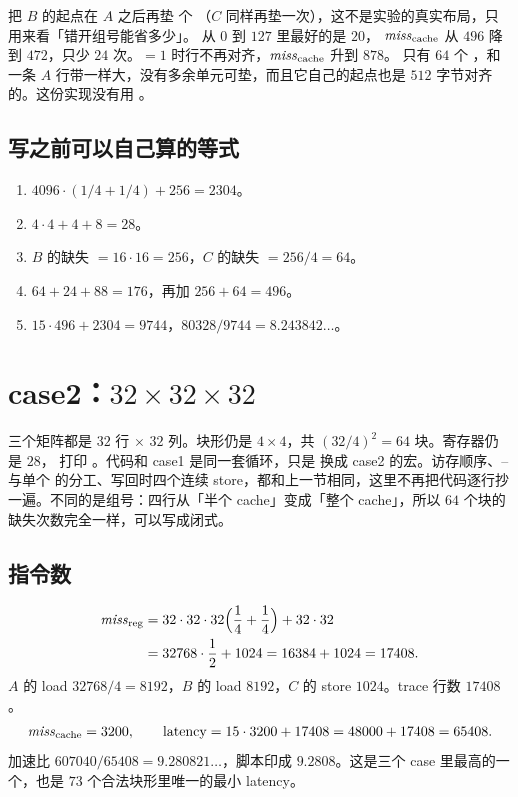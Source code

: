 把 $B$ 的起点在 $A$ 之后再垫  个 （$C$ 同样再垫一次），这不是实验的真实布局，只用来看「错开组号能省多少」。 从 $0$ 到 $127$ 里最好的是 $20$， $\mathit{miss}_{\mathrm{cache}}$ 从 $496$ 降到 $472$，只少 $24$ 次。$=1$ 时行不再对齐，$\mathit{miss}_{\mathrm{cache}}$ 升到 $878$。 只有 $64$ 个 ，和一条 $A$ 行带一样大，没有多余单元可垫，而且它自己的起点也是 $512$ 字节对齐的。这份实现没有用 。

\subsection{写之前可以自己算的等式}

\begin{enumerate}
  \item $4096\cdot(1/4+1/4)+256=2304$。
  \item $4\cdot4+4+8=28$。
  \item $B$ 的缺失 $=16\cdot16=256$，$C$ 的缺失 $=256/4=64$。
  \item $64+24+88=176$，再加 $256+64=496$。
  \item $15\cdot496+2304=9744$，$80328/9744=8.243842\ldots$。
\end{enumerate}

\section{case2：\texorpdfstring{$32\times 32\times 32$}{32x32x32}}
\label{sec:c2}

三个矩阵都是 $32$ 行 $\times$ $32$ 列。块形仍是 $4\times4$，共 $(32/4)^2=64$ 块。寄存器仍是 $28$， 打印 。代码和 case1 是同一套循环，只是  换成 case2 的宏。访存顺序、-- 与单个  的分工、写回时四个连续 store，都和上一节相同，这里不再把代码逐行抄一遍。不同的是组号：四行从「半个 cache」变成「整个 cache」，所以 $64$ 个块的缺失次数完全一样，可以写成闭式。

\subsection{指令数}

\begin{align*}
\mathit{miss}_{\mathrm{reg}}
&=32\cdot32\cdot32\Bigl(\frac14+\frac14\Bigr)+32\cdot32\\
&=32768\cdot\frac12+1024
=16384+1024
=17408.
\end{align*}
$A$ 的 load $32768/4=8192$，$B$ 的 load $8192$，$C$ 的 store $1024$。trace 行数 $17408$。
\[
\mathit{miss}_{\mathrm{cache}}=3200,\qquad \mathrm{latency}=15\cdot3200+17408=48000+17408=65408.
\]
加速比 $607040/65408=9.280821\ldots$，脚本印成 $9.2808$。这是三个 case 里最高的一个，也是 $73$ 个合法块形里唯一的最小 latency。

